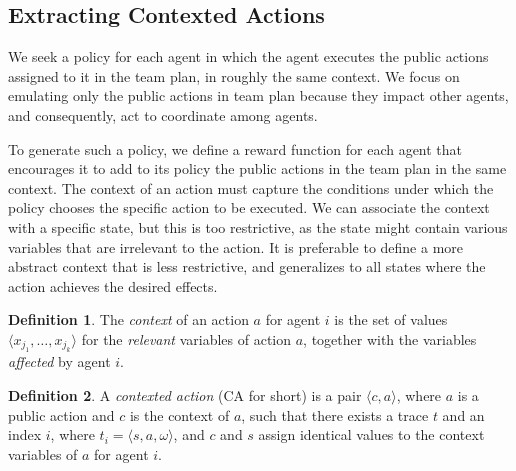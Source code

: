 \documentclass[letterpaper]{article}
\theoremstyle{definition}
\newtheorem{definition}{Definition}
\newcommand{\eliran}[1]{\textbf{[\color{red}ELIRAN:#1]}}
\newcommand{\ronen}[1]{\textbf{[\color{blue}RONEN:#1]}}
\newcommand{\guy}[1]{\textbf{[\color{orange}GUY:#1]}}
\begin{document}
\subsection{Extracting Contexted Actions}
We seek a policy for each agent in which
the agent executes the public actions assigned to it in the team plan, in roughly the same context.
We focus on emulating only the public actions
in team plan because they impact other agents, and consequently, act to coordinate among agents. 

To generate such a policy, we define a reward function for each agent that encourages it to add to its policy the public actions in the team plan in the same context.
The context of an action must capture the conditions under which the policy chooses the specific action to be executed. We can associate the context with a specific state, but this is too restrictive, as the state might contain various variables that are irrelevant to the action. It is preferable to define a more abstract context that is less restrictive, and generalizes to all states where the action achieves the desired effects. 


\begin{definition}
The {\em context} of an action $a$ for agent $i$ is the set of values $\langle x_{j_1},\ldots,x_{j_k} \rangle$ for the \emph{relevant} variables of action $a$, together with the variables \emph{affected} by agent $i$.
\end{definition}

\begin{definition}
A {\em contexted action} (CA for short) is a pair $\langle c,a \rangle$, where $a$ is a public action and $c$ is the context of $a$, such that there exists a trace $t$ and an index $i$, where $t_i=\langle s,a,\omega \rangle$, and $c$ and $s$ assign identical values to the context variables of $a$ for agent $i$.
\end{definition}
\end{document}
